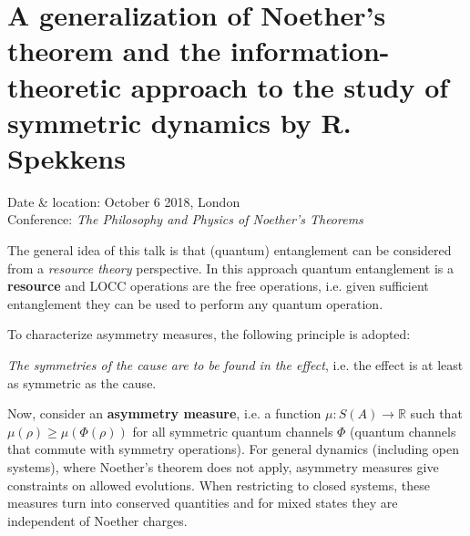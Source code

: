 \section{A generalization of Noether's theorem and the information-theoretic approach to the study of symmetric dynamics by R. Spekkens}

    Date \& location: October 6 2018, London\\
    Conference: \textit{The Philosophy and Physics of Noether's Theorems}

    The general idea of this talk is that (quantum) entanglement can be considered from a \textit{resource theory} perspective. In this approach quantum entanglement is a \textbf{resource} and LOCC operations are the free operations, i.e. given sufficient entanglement they can be used to perform any quantum operation.

    To characterize asymmetry measures, the following principle is adopted:
    \begin{axiom}
        \textit{The symmetries of the cause are to be found in the effect}, i.e. the effect is at least as symmetric as the cause.
    \end{axiom}

    Now, consider an \textbf{asymmetry measure}, i.e. a function $\mu:S(A)\rightarrow\mathbb{R}$ such that $\mu(\rho)\geq\mu(\Phi(\rho))$ for all symmetric quantum channels $\Phi$ (quantum channels that commute with symmetry operations). For general dynamics (including open systems), where Noether's theorem does not apply, asymmetry measures give constraints on allowed evolutions. When restricting to closed systems, these measures turn into conserved quantities and for mixed states they are independent of Noether charges.